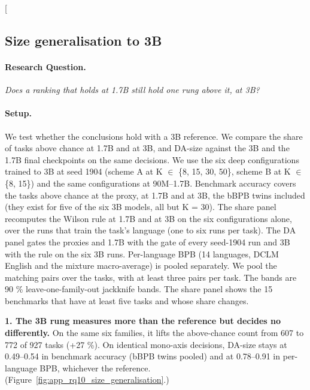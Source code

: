 \clearpage
\twocolumn[{%
\rqparent
\subsection{Size generalisation to 3B}
\label{app:rq10_size_generalisation}

\noindent\begin{minipage}[t]{0.485\textwidth}
\vspace{0pt}
\paragraph{Research Question.} \emph{Does a ranking that holds at 1.7B still hold one rung above it, at 3B?}

\paragraph{Setup.} We test whether the conclusions hold with a 3B reference. We compare the share of tasks above chance at 1.7B and at 3B, and DA-size against the 3B and the 1.7B final checkpoints on the same decisions. We use the six deep configurations trained to 3B at seed 1904 (scheme A at K $\in$ \{8, 15, 30, 50\}, scheme B at K $\in$ \{8, 15\}) and the same configurations at 90M--1.7B. Benchmark accuracy covers the tasks above chance at the proxy, at 1.7B and at 3B, the bBPB twins included (they exist for five of the six 3B models, all but K = 30). The share panel recomputes the Wilson rule at 1.7B and at 3B on the six configurations alone, over the runs that train the task's language (one to six runs per task). The DA panel gates the proxies and 1.7B with the gate of every seed-1904 run and 3B with the rule on the six 3B runs. Per-language BPB (14 languages, DCLM English and the mixture macro-average) is pooled separately. We pool the matching pairs over the tasks, with at least three pairs per task. The bands are 90 \% leave-one-family-out jackknife bands. The share panel shows the 15 benchmarks that have at least five tasks and whose share changes.
\end{minipage}\hfill
\begin{minipage}[t]{0.485\textwidth}
\vspace{0pt}
\begin{rqfinding}
\textbf{1. The 3B rung measures more than the reference but decides no differently.} On the same six families, it lifts the above-chance count from 607 to 772 of 927 tasks (+27 \%). On identical mono-axis decisions, DA-size stays at 0.49--0.54 in benchmark accuracy (bBPB twins pooled) and at 0.78--0.91 in per-language BPB, whichever the reference. (Figure~\ref{fig:app_rq10_size_generalisation}.)

\end{rqfinding}
\end{minipage}}
